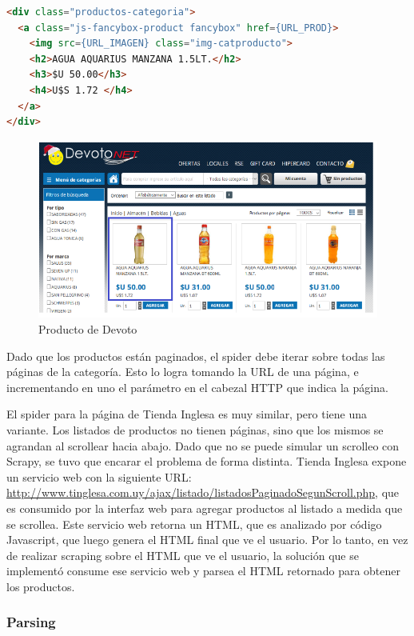\documentclass[12pt]{article} %
\begin{document}
\begin{lstlisting}[language=HTML]
<div class="productos-categoria">
  <a class="js-fancybox-product fancybox" href={URL_PROD}>
    <img src={URL_IMAGEN} class="img-catproducto">
    <h2>AGUA AQUARIUS MANZANA 1.5LT.</h2>
    <h3>$U 50.00</h3>
    <h4>U$S 1.72 </h4>
  </a>
</div>
\end{lstlisting}

\begin{figure}[H]
\includegraphics[scale=1]{producto_devoto}
\centering
\caption{Producto de Devoto}
\end{figure}


Dado que los productos están paginados, el spider debe iterar sobre todas las páginas de la categoría. Esto lo logra tomando la URL de una página, e incrementando en uno el parámetro en el cabezal HTTP que indica la página.

El spider para la página de Tienda Inglesa \cite{TInglesa} es muy similar, pero tiene una variante. Los listados de productos no tienen páginas, sino que los mismos se agrandan al scrollear hacia abajo. Dado que no se puede simular un scrolleo con Scrapy, se tuvo que encarar el problema de forma distinta. Tienda Inglesa expone un servicio web con la siguiente URL: \url{http://www.tinglesa.com.uy/ajax/listado/listadosPaginadoSegunScroll.php}, que es consumido por la interfaz web para agregar productos al listado a medida que se scrollea. Este servicio web retorna un HTML, que es analizado por código Javascript, que luego genera el HTML final que ve el usuario. Por lo tanto, en vez de realizar scraping sobre el HTML que ve el usuario, la solución que se implementó consume ese servicio web y parsea el HTML retornado para obtener los productos.

\subsubsection{Parsing}
\end{document}
